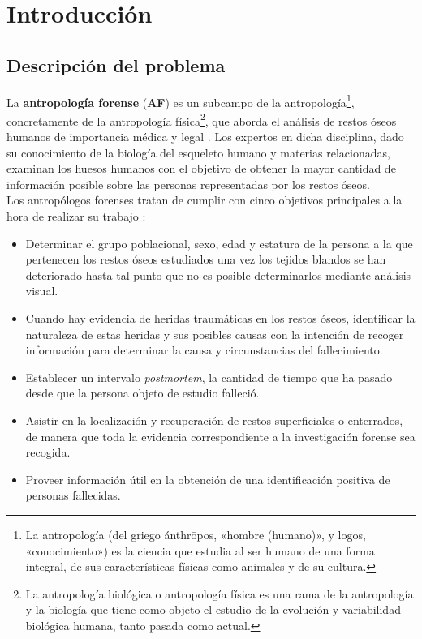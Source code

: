 \chapter{Introducción}

\section{Descripción del problema}

La \textbf{antropología forense} (\textbf{AF}) es un subcampo de la antropología\footnote{La antropología (del griego ánthrōpos, «hombre (humano)», y logos, «conocimiento») es la ciencia que estudia al ser humano de una forma integral, de sus características físicas como animales y de su cultura.}, concretamente de la antropología física\footnote{La antropología biológica o antropología física es una rama de la antropología y la biología que tiene como objeto el estudio de la evolución y variabilidad biológica humana, tanto pasada como actual.}, que aborda el análisis de restos óseos humanos de importancia médica y legal \cite{ubelaker2008forensic}. Los expertos en dicha disciplina, dado su conocimiento de la biología del esqueleto humano y materias relacionadas, examinan los huesos humanos con el objetivo de obtener la mayor cantidad de información posible sobre las personas representadas por los restos óseos.\\


Los antropólogos forenses tratan de cumplir con cinco objetivos principales a la hora de realizar su trabajo \cite{byers2016introduction}:
\begin{itemize}
    \item Determinar el grupo poblacional, sexo, edad y estatura de la persona a la que pertenecen los restos óseos estudiados una vez los tejidos blandos se han deteriorado hasta tal punto que no es posible determinarlos mediante análisis visual.
    \item Cuando hay evidencia de heridas traumáticas en los restos óseos, identificar la naturaleza de estas heridas y sus posibles causas con la intención de recoger información para determinar la causa y circunstancias del fallecimiento.
    \item Establecer un intervalo \textit{postmortem}, la cantidad de tiempo que ha pasado desde que la persona objeto de estudio falleció.
    \item Asistir en la localización y recuperación de restos superficiales o enterrados, de manera que toda la evidencia correspondiente a la investigación forense sea recogida.
    \item Proveer información útil en la obtención de una identificación positiva de personas fallecidas.
\end{itemize}

